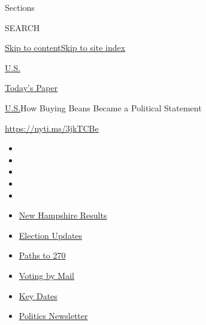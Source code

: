 Sections

SEARCH

\protect\hyperlink{site-content}{Skip to
content}\protect\hyperlink{site-index}{Skip to site index}

\href{https://www.nytimes3xbfgragh.onion/section/us}{U.S.}

\href{https://myaccount.nytimes3xbfgragh.onion/auth/login?response_type=cookie\&client_id=vi}{}

\href{https://www.nytimes3xbfgragh.onion/section/todayspaper}{Today's
Paper}

\href{/section/us}{U.S.}\textbar{}How Buying Beans Became a Political
Statement

\url{https://nyti.ms/3jkTCBe}

\begin{itemize}
\item
\item
\item
\item
\item
\end{itemize}

\begin{itemize}
\item
  \href{https://www.nytimes3xbfgragh.onion/interactive/2020/09/08/us/elections/results-new-hampshire-primary-elections.html?action=click\&pgtype=Article\&state=default\&region=TOP_BANNER\&context=storylines_menu}{New
  Hampshire Results}
\item
  \href{https://www.nytimes3xbfgragh.onion/live/2020/09/08/us/trump-vs-biden?action=click\&pgtype=Article\&state=default\&region=TOP_BANNER\&context=storylines_menu}{Election
  Updates}
\item
  \href{https://www.nytimes3xbfgragh.onion/interactive/2020/us/elections/election-states-biden-trump.html?action=click\&pgtype=Article\&state=default\&region=TOP_BANNER\&context=storylines_menu}{Paths
  to 270}
\item
  \href{https://www.nytimes3xbfgragh.onion/interactive/2020/08/31/us/politics/vote-by-mail-deadlines.html?action=click\&pgtype=Article\&state=default\&region=TOP_BANNER\&context=storylines_menu}{Voting
  by Mail}
\item
  \href{https://www.nytimes3xbfgragh.onion/interactive/2019/us/elections/2020-presidential-election-calendar.html?action=click\&pgtype=Article\&state=default\&region=TOP_BANNER\&context=storylines_menu}{Key
  Dates}
\item
  \href{https://www.nytimes3xbfgragh.onion/newsletters/politics?action=click\&pgtype=Article\&state=default\&region=TOP_BANNER\&context=storylines_menu}{Politics
  Newsletter}
\end{itemize}

